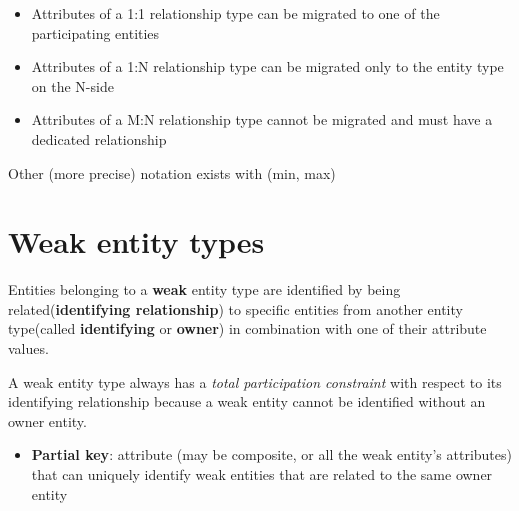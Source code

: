 \begin{itemize}
    \begin{itemize}
        \item Attributes of a 1:1 relationship type can be migrated to one of the participating entities
        \item Attributes of a 1:N relationship type can be migrated only to the entity type on the N-side
        \item Attributes of a M:N relationship type cannot be migrated and must have a dedicated relationship
    \end{itemize}
    
    Other (more precise) notation exists with (min, max)
    
    
\section{Weak entity types}

Entities belonging to a \textbf{weak} entity type are identified by being related(\textbf{identifying relationship}) to specific entities from another entity type(called \textbf{identifying} or \textbf{owner}) in combination with one of their attribute values.

A weak entity type always has a \emph{total participation constraint} with respect to its identifying relationship because a weak entity cannot be identified without an owner entity.

\begin{itemize}
    \item \textbf{Partial key}: attribute (may be composite, or all the weak entity's attributes) that can uniquely identify weak entities that are related to the same owner entity
\end{itemize}

\end{itemize}


